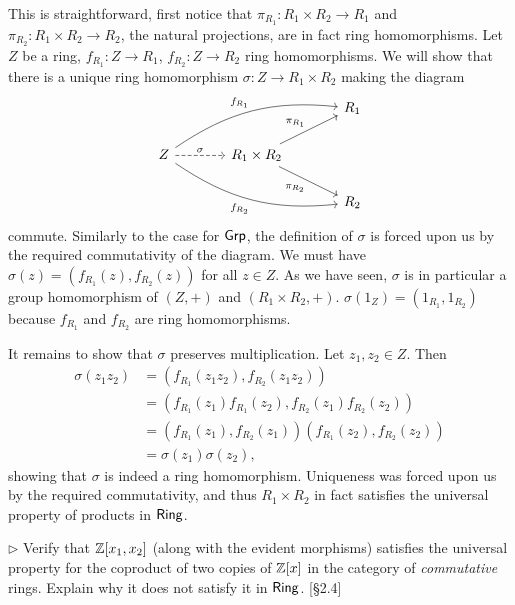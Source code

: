 \begin{solution}
	This is straightforward, first notice that $\pi_{R_1}: R_1 \times R_2 \to R_1$ and $\pi_{R_2}: R_1 \times R_2 \to R_2$, the natural projections, are in fact ring homomorphisms. Let $Z$ be a ring, $f_{R_1}: Z \to R_1$, $f_{R_2}: Z \to R_2$ ring homomorphisms. We will show that there is a unique ring homomorphism $\sigma: Z \to R_1 \times R_2$ making the diagram
	\[
		\begin{tikzcd}[column sep=large]
			& & R_1 \\
			Z
			\arrow[r, dashrightarrow, "\sigma"]
			\arrow[urr, bend left=20, "f_{R_1}"]
			\arrow[drr, bend right=20, "f_{R_2}"']
			& R_1 \times R_2
			\arrow[ur, "\pi_{R_1}"]
			\arrow[dr, "\pi_{R_2}"']
			& \\
			& & R_2
		\end{tikzcd}
	\]
	commute. Similarly to the case for $\mathsf{Grp}$, the definition of $\sigma$ is forced upon us by the required commutativity of the diagram. We must have $\sigma(z) = (f_{R_1}(z), f_{R_2}(z))$ for all $z \in Z$. As we have seen, $\sigma$ is in particular a group homomorphism of $(Z, +)$ and $(R_1 \times R_2, +)$. $\sigma(1_Z) = (1_{R_1}, 1_{R_2})$ because $f_{R_1}$ and $f_{R_2}$ are ring homomorphisms.
	
	It remains to show that $\sigma$ preserves multiplication. Let $z_1, z_2 \in Z$. Then
	\begin{align*}
		\sigma(z_1 z_2) &= (f_{R_1}(z_1 z_2), f_{R_2}(z_1 z_2)) \\
		&= (f_{R_1}(z_1) f_{R_1}(z_2), f_{R_2}(z_1) f_{R_2}(z_2)) \\
		&= (f_{R_1}(z_1), f_{R_2}(z_1))(f_{R_1}(z_2), f_{R_2}(z_2)) \\
		&= \sigma(z_1) \sigma(z_2) \text{,}
	\end{align*}
	showing that $\sigma$ is indeed a ring homomorphism. Uniqueness was forced upon us by the required commutativity, and thus $R_1 \times R_2$ in fact satisfies the universal property of products in $\mathsf{Ring}$.
\end{solution}

\begin{problem}
	$\triangleright$ Verify that $\mathbb{Z}[x_1, x_2]$ (along with the evident morphisms) satisfies the universal property for the coproduct of two copies of $\mathbb{Z}[x]$ in the category of \emph{commutative} rings. Explain why it does not satisfy it in $\mathsf{Ring}$. [\S 2.4]
\end{problem}

